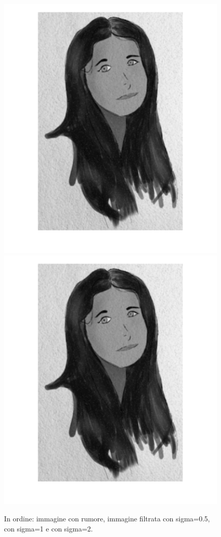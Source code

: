 \begin{figure}[htb]
\includegraphics[scale=0.15,trim={0cm 0cm 3cm 0cm},clip]{Pictures/Esempi di utilizzo/Esempio 5/ami_filtrata_sigma1_kappa60_resize.png}
\includegraphics[scale=0.15,trim={3cm 0cm 0cm 0cm},clip]{Pictures/Esempi di utilizzo/Esempio 5/ami_filtrata_sigma2_kappa60_resize.png}
\caption{In ordine: immagine con rumore, immagine filtrata con sigma=0.5, con sigma=1 e con sigma=2.}\label{fig:figura}
\end{figure} 
